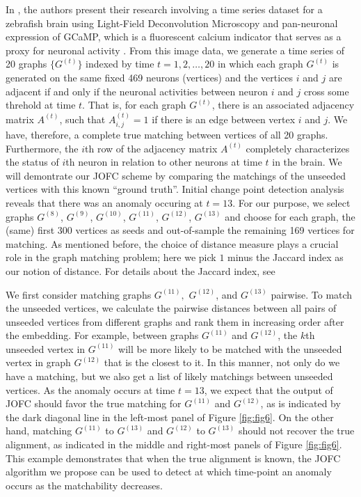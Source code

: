 \documentclass[12pt]{article}
\numberwithin{equation}{section}
\theoremstyle{definition}
\begin{document}
In \cite{fishbrain}, the authors present their research involving a time
series dataset for a zebrafish 
brain using Light-Field Deconvolution Microscopy and pan-neuronal
expression of GCaMP, which is a fluorescent calcium indicator that
serves as a proxy for neuronal activity \cite{fishbrain, fastjofc}. 
From this image data, we generate a time series of 20 graphs $\{ G^{(t)}
\}$ indexed by time $t = 1, 2, \ldots, 20$ in which each graph $G^{(t)}$ is
generated on the same fixed 469 neurons (vertices) and the vertices $i$
and $j$ are adjacent if and only if the neuronal activities between
neuron $i$ and $j$ cross some threhold at time $t$. That is, for each
graph $G^{(t)}$, there is an associated adjacency matrix $A^{(t)}$, such
that $A_{i,j} ^{(t)} = 1$ if there is an edge between vertex $i$ and
$j$.  We have, therefore, a complete true matching between vertices of
all 20 graphs. Furthermore, the $i$th row of the adjacency matrix
$A^{(t)}$ completely characterizes the status of $i$th neuron in
relation to other neurons at time $t$ in the brain. We will demontrate
our JOFC scheme by comparing the matchings of the unseeded vertices with
this known ``ground truth''.
Initial change point detection analysis reveals that there was an
anomaly occuring at $t=13.$ 
For our purpose, we select graphs $G^{(8)}$,
$G^{(9)}$, $G^{(10)}$, $G^{(11)}$, $G^{(12)}$, $G^{(13)}$ and choose for
each graph, the (same) first 300 vertices as seeds and out-of-sample the
remaining 169 vertices for matching. 
As mentioned before, the choice of distance measure plays a crucial role
in the graph matching problem; here we pick $1$ minus the Jaccard index
as our notion of distance. For details about the Jaccard index, see
\cite{jaccard}

We first consider matching graphs $G^{(11)},$ $G^{(12)}$, and $G^{(13)}$
pairwise. 
To match the unseeded vertices, we calculate the pairwise distances
between all pairs of unseeded vertices from different graphs and rank
them in increasing order after the embedding. 
For example, between graphs $G^{(11)}$ and $G^{(12)}$, the $k$th
unseeded vertex in $G^{(11)}$ will be more likely to be matched with the
unseeded vertex in graph $G^{(12)}$ that is the closest to it.
In this manner, not only do we have a matching, but we also get a list of likely matchings between unseeded vertices.
As the anomaly occurs at time $t=13$, we expect that the
output of JOFC should favor the true matching for $G^{(11)}$ and
$G^{(12)}$, as is indicated by the dark diagonal line in the left-most
panel of Figure \ref{fig:fig6}. On the other hand, matching $G^{(11)}$
to $G^{(13)}$ and $G^{(12)}$ to $G^{(13)}$ should not recover the true
alignment, as indicated in the middle and right-most panels of Figure
\ref{fig:fig6}. This example demonstrates that when the true alignment
is known, the JOFC algorithm we propose can be used to detect at which
time-point an anomaly occurs as the matchability decreases.
\end{document}

